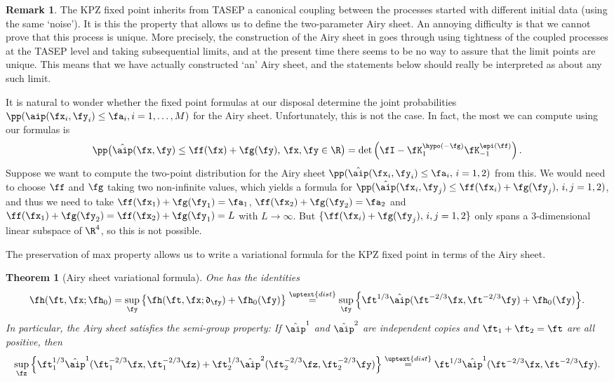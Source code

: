 \documentclass[]{pcmi}
\theoremstyle{plain}
\newtheorem{theorem}[equation]{Theorem}
\theoremstyle{definition}
\newtheorem{remark}[equation]{Remark}
\begin{document}
\begin{remark}
The KPZ fixed point inherits from TASEP a canonical coupling between the processes started with different initial data (using the same `noise').
It is this the property that allows us to define the two-parameter Airy sheet.
An annoying difficulty is that we cannot prove that this process is unique.
More precisely, the construction of the Airy sheet in \cite{fixedpt} goes through using tightness of the coupled processes at the TASEP level and taking subsequential limits, and at the present time there seems to be no way to assure that the limit points are unique. 
This means that we have actually constructed `an' Airy sheet, and the statements below should really be interpreted as about any such
limit.

\noindent It is natural to wonder whether the fixed point formulas at our disposal determine the joint probabilities $\pp(\aip(\fx_i,\fy_i)\le \fa_i, i=1,\ldots,M)$ for the Airy sheet.
Unfortunately, this is not the case.
In fact, the most we can compute using our formulas is \[\pp\bigl(\hat\aip(\fx,\fy)  \le \ff(\fx)+\fg(\fy),\,\fx,\fy\in\R\bigr)  = \det\left(\fI-\fK^{\hypo(-\fg)}_{1} \fK^{\epi(\ff)}_{-1}\right).\]
Suppose we want to compute the two-point distribution for the Airy sheet $\pp(\hat\aip(\fx_i,\fy_i)  \le \fa_i,\,i=1,2)$ from this.
We would need to choose $\ff$ and $\fg$ taking two non-infinite values, which yields a formula for $\pp(\hat\aip(\fx_i,\fy_j)  \le \ff(\fx_i)+\fg(\fy_j),\,i,j=1,2)$, and thus we need to take $\ff(\fx_1)+\fg(\fy_1)=\fa_1$, $\ff(\fx_2)+\fg(\fy_2)=\fa_2$ and $\ff(\fx_1)+\fg(\fy_2)=\ff(\fx_2)+\fg(\fy_1)=L$ with $L\to\infty$.
But $\{\ff(\fx_i)+\fg(\fy_j),\,i,j=1,2\}$ only spans a 3-dimensional linear subspace of $\R^4$, so this is not possible.
\end{remark}

The preservation of max property allows us to write a  variational formula for the KPZ fixed point in terms of the Airy sheet.
\begin{theorem}[Airy sheet variational formula]\label{thm:airyvar}
One has the identities
\begin{equation}\label{eq:var}
\fh(\ft,\fx;\fh_0) = \sup_\fy\big\{ \fh(\ft,\fx;\mathfrak{d}_\fy) + \fh_0(\fy)\big\}  \stackrel{\uptext{dist}}{=}  \sup_\fy\Big\{ \ft^{1/3}\hat\aip(\ft^{-2/3} \fx,\ft^{-2/3} \fy) + \fh_0(\fy)\Big\}.
\end{equation}
In particular, the Airy sheet satisfies the \emph{semi-group property}: If $\hat\aip^1$ and $\hat\aip^2$ are independent copies and $\ft_1+\ft_2=\ft$ are all positive, then
\begin{equation*}
 \sup_\fz\left\{ \ft_1^{1/3}\hat\aip^1(\ft_1^{-2/3} \fx,\ft_1^{-2/3} \fz) +  \ft_2^{1/3}\hat\aip^2(\ft_2^{-2/3} \fz,\ft_2^{-2/3} \fy) \right\} \stackrel{\uptext{dist}}{=} \ft^{1/3}\hat\aip^1(\ft^{-2/3} \fx,\ft^{-2/3} \fy).
\end{equation*}
\end{theorem}
\end{document}
